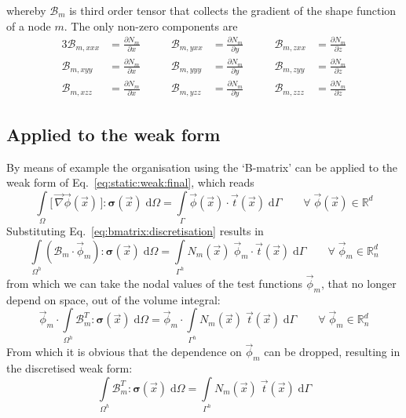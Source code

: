 \documentclass[times,namecite]{goose-article}
\begin{document}
whereby $\mathcal{B}_m$ is third order tensor that collects the gradient of the shape function of a node $m$. The only non-zero components are
\begin{alignat}{3}
  \mathcal{B}_{m,x x x} &= \frac{\partial N_m}{\partial x} & \qquad
  \mathcal{B}_{m,y x x} &= \frac{\partial N_m}{\partial y} & \qquad
  \mathcal{B}_{m,z x x} &= \frac{\partial N_m}{\partial z}
  \nonumber
  \\
  \mathcal{B}_{m,x y y} &= \frac{\partial N_m}{\partial x}  & \qquad
  \mathcal{B}_{m,y y y} &= \frac{\partial N_m}{\partial y}  & \qquad
  \mathcal{B}_{m,z y y} &= \frac{\partial N_m}{\partial z}
  \\
  \mathcal{B}_{m,x z z} &= \frac{\partial N_m}{\partial x}  & \qquad
  \mathcal{B}_{m,y z z} &= \frac{\partial N_m}{\partial y}  & \qquad
  \mathcal{B}_{m,z z z} &= \frac{\partial N_m}{\partial z}
\end{alignat}

\subsection{Applied to the weak form}

By means of example the organisation using the `B-matrix' can be applied to the weak form of Eq.~\eqref{eq:static:weak:final}, which reads
\begin{equation}
  \int\limits_\Omega
    \big[\, \vec{\nabla} \vec{\phi}(\vec{x}) \,\big] : \bm{\sigma}(\vec{x}) \;
  \mathrm{d}\Omega
  =
  \int\limits_\Gamma
    \vec{\phi}(\vec{x}) \cdot
    \vec{t}(\vec{x}) \;
  \mathrm{d}\Gamma
  \qquad
  \forall \; \vec{\phi}(\vec{x}) \in \mathbb{R}^d
\end{equation}
Substituting Eq.~\eqref{eq:bmatrix:discretisation} results in
\begin{equation}
  \int\limits_{\Omega^h}
    \left( \mathcal{B}_m \cdot \vec{\phi}_m \right) : \bm{\sigma}(\vec{x}) \;
  \mathrm{d}\Omega
  =
  \int\limits_{\Gamma^h}
    N_m (\vec{x}) \; \vec{\phi}_m \cdot \vec{t}(\vec{x}) \;
  \mathrm{d}\Gamma
  \qquad
  \forall \; \vec{\phi}_m \in \mathbb{R}^d_n
\end{equation}
from which we can take the nodal values of the test functions $\vec{\phi}_m$, that no longer depend on space, out of the volume integral:
\begin{equation}
  \vec{\phi}_m \cdot
  \int\limits_{\Omega^h}
    \mathcal{B}_m^T : \bm{\sigma}(\vec{x}) \;
  \mathrm{d}\Omega
  =
  \vec{\phi}_m \cdot
  \int\limits_{\Gamma^h}
    N_m(\vec{x}) \; \vec{t}(\vec{x}) \;
  \mathrm{d}\Gamma
  \qquad
  \forall \; \vec{\phi}_m \in \mathbb{R}^d_n
\end{equation}
From which it is obvious that the dependence on $\vec{\phi}_m$ can be dropped, resulting in the discretised weak form:
\begin{equation}
\label{eq:bmatrix:weak_form:discrete}
  \int\limits_{\Omega^h}
    \mathcal{B}_m^T : \bm{\sigma}(\vec{x}) \;
  \mathrm{d}\Omega
  =
  \int\limits_{\Gamma^h}
    N_m(\vec{x}) \; \vec{t}(\vec{x}) \;
  \mathrm{d}\Gamma
\end{equation}
\end{document}
